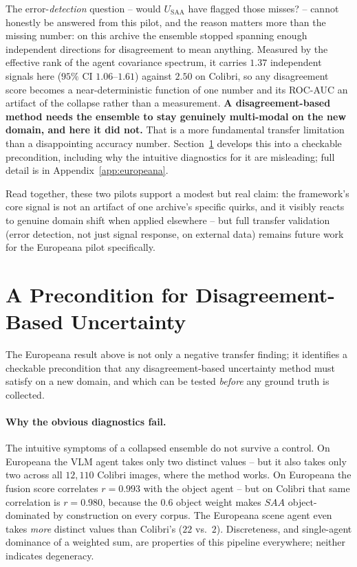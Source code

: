 \documentclass[12pt,a4paper]{report}
\begin{document}
The error-\emph{detection} question -- would $U_{\text{SAA}}$ have flagged those misses? -- cannot honestly be answered from this pilot, and the reason matters more than the missing number: on this archive the ensemble stopped spanning enough independent directions for disagreement to mean anything. Measured by the effective rank of the agent covariance spectrum, it carries $1.37$ independent signals here ($95\%$ CI $1.06$--$1.61$) against $2.50$ on Colibri, so any disagreement score becomes a near-deterministic function of one number and its ROC-AUC an artifact of the collapse rather than a measurement. \textbf{A disagreement-based method needs the ensemble to stay genuinely multi-modal on the new domain, and here it did not.} That is a more fundamental transfer limitation than a disappointing accuracy number. Section~\ref{sec:heterogeneity_precondition} develops this into a checkable precondition, including why the intuitive diagnostics for it are misleading; full detail is in Appendix~\ref{app:europeana}.

Read together, these two pilots support a modest but real claim: the framework's core signal is not an artifact of one archive's specific quirks, and it visibly reacts to genuine domain shift when applied elsewhere -- but full transfer validation (error detection, not just signal response, on external data) remains future work for the Europeana pilot specifically.

\section{A Precondition for Disagreement-Based Uncertainty}
\label{sec:heterogeneity_precondition}
The Europeana result above is not only a negative transfer finding; it identifies a checkable precondition that any disagreement-based uncertainty method must satisfy on a new domain, and which can be tested \emph{before} any ground truth is collected.

\paragraph{Why the obvious diagnostics fail.} The intuitive symptoms of a collapsed ensemble do not survive a control. On Europeana the VLM agent takes only two distinct values -- but it also takes only two across all $12{,}110$ Colibri images, where the method works. On Europeana the fusion score correlates $r=0.993$ with the object agent -- but on Colibri that same correlation is $r=0.980$, because the $0.6$ object weight makes $SAA$ object-dominated by construction on every corpus. The Europeana scene agent even takes \emph{more} distinct values than Colibri's ($22$ vs.\ $2$). Discreteness, and single-agent dominance of a weighted sum, are properties of this pipeline everywhere; neither indicates degeneracy.
\end{document}
